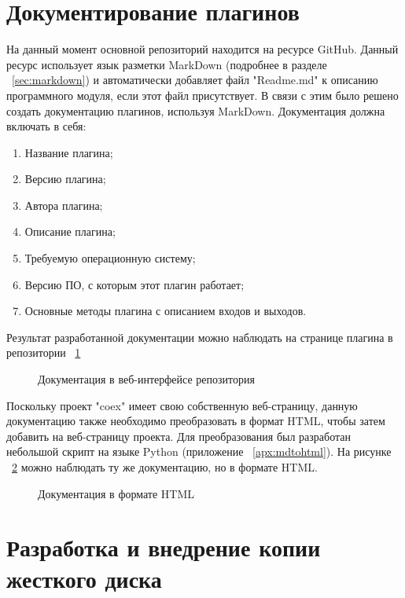 



\section{Документирование плагинов}

На данный момент основной репозиторий находится на ресурсе GitHub. Данный ресурс использует язык разметки MarkDown (подробнее в разделе ~\ref{sec:markdown}) и автоматически добавляет файл "Readme.md" к описанию программного модуля, если этот файл присутствует. В связи с этим было решено создать документацию плагинов, используя MarkDown. Документация должна включать в себя:

\begin{enumerate}
  \item Название плагина;
  \item Версию плагина;
  \item Автора плагина;
  \item Описание плагина;
  \item Требуемую операционную систему;
  \item Версию ПО, с которым этот плагин работает;
  \item Основные методы плагина с описанием входов и выходов.
\end{enumerate}

Результат разработанной документации можно наблюдать на странице плагина в репозитории ~\ref{bok_1:bok_1}

\begin{figure}[!ht]
\caption{ Документация в веб-интерфейсе репозитория }
\label{bok_1:bok_1}
\end{figure}

Поскольку проект "coex" имеет свою собственную веб-страницу, данную документацию также необходимо преобразовать в формат HTML, чтобы затем добавить на веб-страницу проекта. Для преобразования был разработан небольшой скрипт на языке Python (приложение ~\ref{apx:mdtohtml}). На рисунке ~\ref{bok_2:bok_2} можно наблюдать ту же документацию, но в формате HTML.

\begin{figure}[!ht]
\caption{ Документация в формате HTML }
\label{bok_2:bok_2}
\end{figure}

\section{Разработка и внедрение копии жесткого диска}

